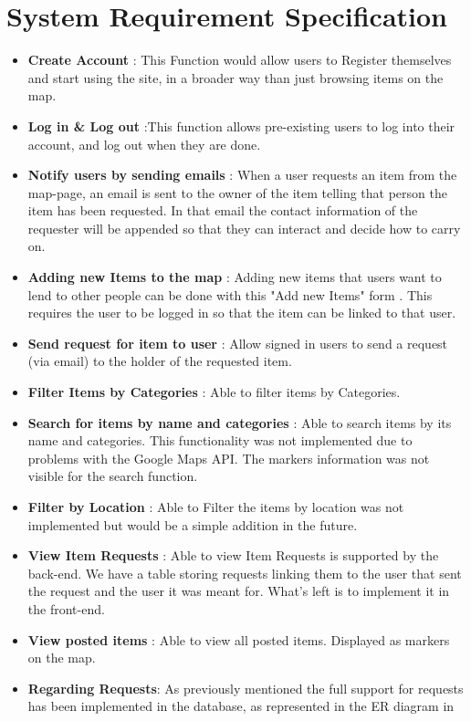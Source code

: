 \documentclass[a4paper]{article}
\begin{document}
\section{System Requirement Specification}
\begin{itemize}
\item \textbf{Create Account} : This Function would allow users to Register themselves and start using the site, in a broader way than just browsing items on the map.
\item \textbf{Log in \& Log out} :This function allows pre-existing users to log into their account, and log out when they are done.
\item \textbf{Notify users by sending emails} : When a user requests an item from the map-page, an email is sent to the owner of the item telling that person the item has been requested.  In that email the contact information of the requester will be appended so that they can interact and decide how to carry on.
\item \textbf{Adding new Items to the map} : Adding new items that users want to lend to other people can be done with this "Add new Items" form . This requires the user to be logged in so that the item can be linked to that user.
\item \textbf{Send request for item to user} : Allow signed in users to send a request (via email) to the holder of the requested item.
\item \textbf{Filter Items by Categories} : Able to filter items by Categories.
\item \textbf{Search for items by name and categories} : Able to search items by its name and categories. This functionality was not implemented due to problems with the Google Maps API. The markers information was not visible for the search function.
\item \textbf{Filter by Location} : Able to Filter the items by location was not implemented but would be a simple addition in the future.
\item \textbf{View Item Requests} : Able to view Item Requests is supported by the back-end. We have a table storing requests linking them to the user that sent the request and the user it was meant for. What's left is to implement it in the front-end.
\item \textbf{View posted items} : Able to view all posted items. Displayed as markers on the map.
\item  \textbf{Regarding Requests}: As previously mentioned the full support for requests has been implemented in the database, as represented in the ER diagram in 

\end{itemize}
\end{document}
